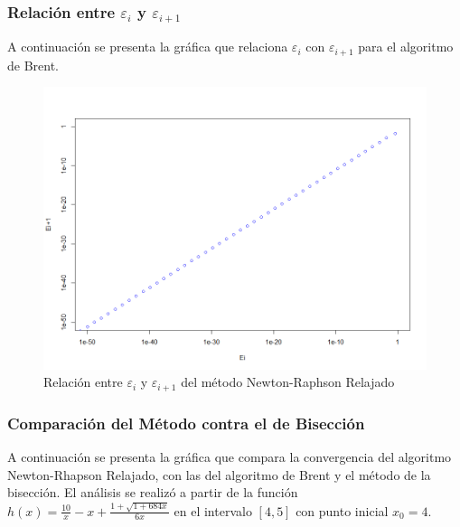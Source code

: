 \documentclass[a4paper,12pt]{article}
\begin{document}
\vspace{-1em}

\subsubsection{Relación entre $\varepsilon_i$ y $\varepsilon_{i+1}$}

A continuación se presenta la gráfica que relaciona $\varepsilon_i$ con $\varepsilon_{i+1}$ para el algoritmo de Brent. \par

\vspace{-1em}
\begin{figure}[ht!]
\centering
\includegraphics[scale=0.4]{img/nrr_relacion_error.png}
\vspace{-1em}
\caption{Relación entre $\varepsilon_i$ y $\varepsilon_{i+1}$ del método Newton-Raphson Relajado}
\label{fig:nrr_relacion_error}
\end{figure}

\newpage

\subsubsection{Comparación del Método contra el de Bisección}

A continuación se presenta la gráfica que compara la convergencia del algoritmo Newton-Rhapson Relajado, con las del algoritmo de Brent y el método de la bisección. El análisis se realizó a partir de la función $h(x)=\frac{10}{x}-x +\frac{1 + \sqrt{1 + 684 x}}{6x}$ en el intervalo $[4,5]$ con punto inicial $x_0 = 4$. \par
\end{document}
